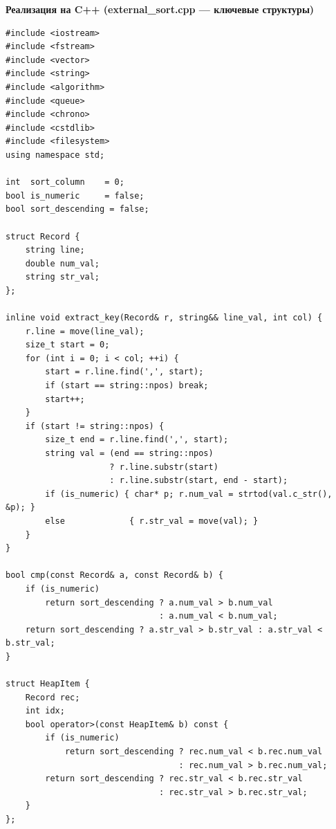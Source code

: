 \documentclass[oneside,a4paper,14pt]{extarticle}
\begin{document}
\newpage
\textbf{Реализация на C++ (external\_sort.cpp --- ключевые структуры)}
\small
\begin{verbatim}
#include <iostream>
#include <fstream>
#include <vector>
#include <string>
#include <algorithm>
#include <queue>
#include <chrono>
#include <cstdlib>
#include <filesystem>
using namespace std;

int  sort_column    = 0;
bool is_numeric     = false;
bool sort_descending = false;

struct Record {
    string line;
    double num_val;
    string str_val;
};

inline void extract_key(Record& r, string&& line_val, int col) {
    r.line = move(line_val);
    size_t start = 0;
    for (int i = 0; i < col; ++i) {
        start = r.line.find(',', start);
        if (start == string::npos) break;
        start++;
    }
    if (start != string::npos) {
        size_t end = r.line.find(',', start);
        string val = (end == string::npos)
                     ? r.line.substr(start)
                     : r.line.substr(start, end - start);
        if (is_numeric) { char* p; r.num_val = strtod(val.c_str(), &p); }
        else             { r.str_val = move(val); }
    }
}

bool cmp(const Record& a, const Record& b) {
    if (is_numeric)
        return sort_descending ? a.num_val > b.num_val
                               : a.num_val < b.num_val;
    return sort_descending ? a.str_val > b.str_val : a.str_val < b.str_val;
}

struct HeapItem {
    Record rec;
    int idx;
    bool operator>(const HeapItem& b) const {
        if (is_numeric)
            return sort_descending ? rec.num_val < b.rec.num_val
                                   : rec.num_val > b.rec.num_val;
        return sort_descending ? rec.str_val < b.rec.str_val
                               : rec.str_val > b.rec.str_val;
    }
};
\end{verbatim}
\end{document}
